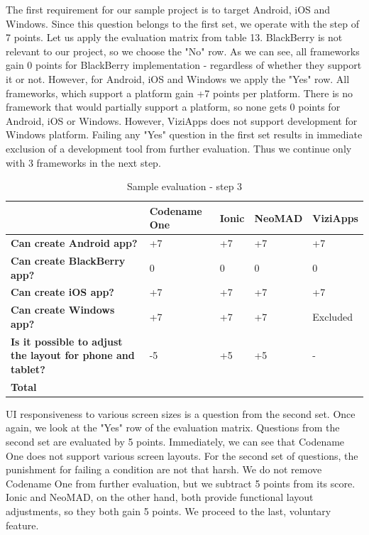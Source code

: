 \documentclass[english,master,public,dept460,male,cpdeclaration,oneside]{diploma}
\begin{document}
The first requirement for our sample project is to target Android, iOS and Windows. Since this question belongs to the first set, we operate with the step of 7 points. Let us apply the evaluation matrix from table 13. BlackBerry is not relevant to our project, so we choose the "No" row. As we can see, all frameworks gain 0 points for BlackBerry implementation - regardless of whether they support it or not. However, for Android, iOS and Windows we apply the "Yes" row. All frameworks, which support a platform gain +7 points per platform. There is no framework that would partially support a platform, so none gets 0 points for Android, iOS or Windows. However, ViziApps does not support development for Windows platform. Failing any "Yes" question in the first set results in immediate exclusion of a development tool from further evaluation. Thus we continue only with 3 frameworks in the next step.

\begin{table}[!h]
	\centering
	\caption{Sample evaluation - step 3}
	\label{table:sampleEvaluation3}
	\begin{tabular}{p{2.5cm} | p{2.5cm} | p{2.5cm} | p{2.5cm} | p{2.5cm}}
		\toprule
		& \textbf{Codename One} & \textbf{Ionic} & \textbf{NeoMAD} & \textbf{ViziApps} \\
		\midrule
		\textbf{Can create Android app?} & +7 & +7 & +7 & +7 \\
		\textbf{Can create BlackBerry app?} & 0 & 0 & 0 & 0 \\
		\textbf{Can create iOS app?} & +7 & +7 & +7 & +7 \\
		\textbf{Can create Windows app?} & +7 & +7 & +7 & Excluded \\
		\midrule
		\textbf{Is it possible to adjust the layout for phone and tablet?} & -5 & +5 & +5 & - \\
		\midrule
		\textbf{Total} &&&& \\
		\midrule
	\end{tabular}
\end{table}

UI responsiveness to various screen sizes is a question from the second set. Once again, we look at the "Yes" row of the evaluation matrix. Questions from the second set are evaluated by 5 points. Immediately, we can see that Codename One does not support various screen layouts. For the second set of questions, the punishment for failing a condition are not that harsh. We do not remove Codename One from further evaluation, but we subtract 5 points from its score. Ionic and NeoMAD, on the other hand, both provide functional layout adjustments, so they both gain 5 points. We proceed to the last, voluntary feature.
\end{document}
